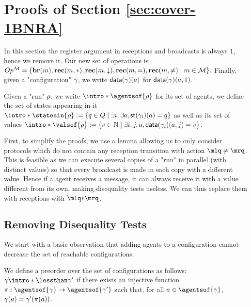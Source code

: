 
\section{Proofs of Section \ref{sec:cover-1BNRA}}
\label{app:cover-one-reg}

In this section the register argument in receptions and broadcasts is always $1$, hence we remove it.
Our new set of operations is 
$
Op^{\mathcal{M}} = \{\textbf{br}(m), \textbf{rec}(m, {*}), \textbf{rec}(m, \downarrow), \textbf{rec}(m, {=}), \textbf{rec}(m, {\ne}) \mid m \in \mathcal{M}\}.
$
Finally, given a "configuration" $\gamma$, we write $\mathsf{data}(\gamma)(a)$ for $\mathsf{data}(\gamma)(a,1)$. 

Given a "run" $\rho$, we write $\intro*\agentsof{\run}$ for its set of agents, we define the set of states appearing in it $\intro*\statesin{\run}:= \set{q \in Q \mid \exists i, \exists a, \st{\config_i}(a) = q}$  as well as its set of values $\intro*\valsof{\run} := \set{\aval \in \nats \mid \exists i,j, a, \data{\config_i}(a,j) = \aval}$.  

First, to simplify the proofs, we use a lemma allowing us to only consider protocols which do not contain any reception transition with action $\quotemarks{\ne}$. This is feasible as we can execute several copies of a "run" in parallel (with distinct values) so that every broadcast is made in each copy with a different value. Hence if a agent receives a message, it can always receive it with a value different from its own, making disequality tests useless. We can thus replace them with receptions with $\quotemarks{\dummyact}$. 




\subsection{Removing Disequality Tests}
\label{sec:one-diseq-tests}

We start with a basic observation that adding agents to a configuration cannot decrease the set of reachable configurations.


\begin{definition}
	We define a preorder over the set of configurations as follows: $\config \intro*\lessthan \config'$ if there exists an injective function $\pi: \agentsof{\config} \rightarrow \agentsof{\config'}$ such that, for all $a \in \agentsof{\config}$, $\gamma(a) = \gamma'(\pi(a))$. 
\end{definition}

